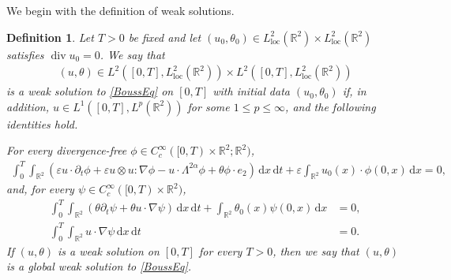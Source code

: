 \documentclass[reqno,11pt,a4paper]{amsart}
\newtheorem{definition}[theorem]{Definition}
\newcommand{\dd}{\mathrm{d}}
\begin{document}
We begin with the definition of weak solutions.

\begin{definition}\label{defn:weak-Bouss}
Let $T>0$ be fixed and let $(u_0,\theta_0)\in L_{\mathrm{loc}}^2 (\mathbb R^2)\times L_{\mathrm{loc}}^2 (\mathbb R^2)$ satisfies $\operatorname{div}u_0=0$. We say that
\begin{align*}
    (u,\theta)
    \in
    L^2([0,T], L_{\mathrm{loc}}^2 (\mathbb R^2))
    \times
    L^2([0,T], L_{\mathrm{loc}}^2 (\mathbb R^2))
\end{align*}
is a weak solution to \eqref{BoussEq} on $[0,T]$ with initial data
$(u_0,\theta_0)$ if, in addition, $u\in L^1([0,T],L^p(\mathbb R^2))$ for some $1\leq p\leq\infty$, and the following identities hold.

For every divergence-free
$\phi\in C_c^\infty([0,T)\times\mathbb R^2;\mathbb R^2)$,
\begin{align*}
 \int_0^T\int_{\mathbb R^2}
 \left(
   \varepsilon u\cdot\partial_t\phi
   +\varepsilon u\otimes u:\nabla\phi
   -u\cdot\Lambda^{2\alpha}\phi
   +\theta\phi\cdot e_2
 \right)\,\dd x\,\dd t +\varepsilon\int_{\mathbb R^2}
    u_0(x)\cdot\phi(0,x)\,\dd x
 =0,
\end{align*}
and, for every
$\psi\in C_c^\infty([0,T)\times\mathbb R^2)$,
\begin{align*}
 \int_0^T\int_{\mathbb R^2}
 \left(
   \theta\partial_t\psi
   +\theta u\cdot\nabla\psi
 \right)\,\dd x\,\dd t
 +\int_{\mathbb R^2}
    \theta_0(x)\psi(0,x)\,\dd x
 &=0,\\
 \int_0^T\int_{\mathbb R^2}
 u\cdot\nabla\psi\,\dd x\,\dd t
 &=0.
\end{align*}
If $(u,\theta)$ is a weak solution on $[0,T]$ for every $T>0$,
then we say that $(u,\theta)$ is a global weak solution to \eqref{BoussEq}.
\end{definition}
\end{document}
